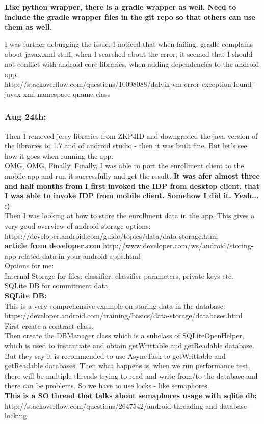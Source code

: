 \documentclass[11pt]{article}
\begin{document}
\textbf{Like python wrapper, there is a gradle wrapper as well. Need to include the gradle wrapper files in the git repo so that others can use them 
as well.}

I was further debugging the issue. I noticed that when failing, gradle complains about javax.xml stuff, when I searched about the error, it seemed 
that I should not conflict with android core libraries, when adding dependencies to the android app.\\
http://stackoverflow.com/questions/10098088/dalvik-vm-error-exception-found-javax-xml-namespace-qname-class\\

\subsubsection*{Aug 24th:}
Then I removed jersy libraries from ZKP4ID and downgraded the java version of the libraries to 1.7 and of android studio - then it was built fine. 
But let's see how it goes when running the app.\\

OMG, OMG, Finally, Finally, I was able to port the enrollment client to the mobile app and run it successfully and get the result.
\textbf{It was afer almost three and half months from I first invoked the IDP from desktop client, that I was able to invoke IDP from mobile client. 
Somehow I did it. Yeah... :)}\\

Then I was looking at how to store the enrollment data in the app. This gives a very good overview of android storage options: 
https://developer.android.com/guide/topics/data/data-storage.html\\
\textbf{article from developer.com} http://www.developer.com/ws/android/storing-app-related-data-in-your-android-apps.html\\

Options for me:\\
Internal Storage for files: classifier, classifier parameters, private keys etc.\\
SQLite DB for commitment data.\\

\textbf{SQLite DB:}\\
This is a very comprehensive example on storing data in the database: https://developer.android.com/training/basics/data-storage/databases.html\\
First create a contract class.\\
Then create the DBManager class which is a subclass of SQLiteOpenHelper, which is used to instantiate and obtain getWrittable and getReadable 
database.\\
But they say it is recommended to use AsyncTask to getWrittable and getReadable databases. Then what happens is, when we run performance test, there 
will be multiple threads trying to read and write from/to the database and there can be problems. So we have to use locks - like semaphores.\\
\textbf{This is a SO thread that talks about semaphores usage with sqlite db:} 
http://stackoverflow.com/questions/2647542/android-threading-and-database-locking\\
\end{document}
